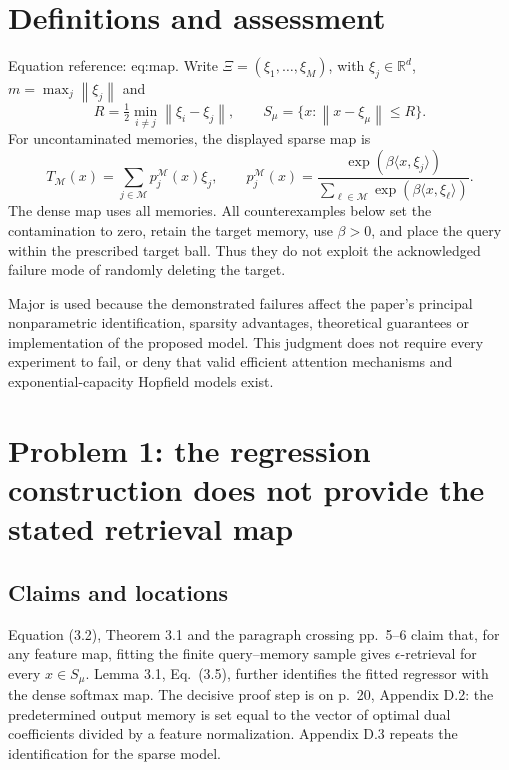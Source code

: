\documentclass[10pt]{article}
\begin{document}
\section*{Definitions and assessment}
Equation reference: eq:map. Write \(\Xi=(\xi_1,\ldots,\xi_M)\), with \(\xi_j\in\mathbb R^d\), \(m=\max_j\left\lVert \xi_j\right\rVert\) and \[R=\tfrac12\min_{i\ne j}\left\lVert \xi_i-\xi_j\right\rVert,\qquad
 S_\mu=\{x:\left\lVert x-\xi_\mu\right\rVert\le R\}.\] For uncontaminated memories, the displayed sparse map is \[
 T_\mathcal M(x)=\sum_{j\in\mathcal M}p^\mathcal M_j(x)\xi_j,\qquad
 p^\mathcal M_j(x)=\frac{\exp(\beta\langle x,\xi_j\rangle)}
 {\sum_{\ell\in\mathcal M}\exp(\beta\langle x,\xi_\ell\rangle)}.\] The dense map uses all memories. All counterexamples below set the contamination to zero, retain the target memory, use \(\beta>0\), and place the query within the prescribed target ball. Thus they do not exploit the acknowledged failure mode of randomly deleting the target.\par
Major is used because the demonstrated failures affect the paper’s principal nonparametric identification, sparsity advantages, theoretical guarantees or implementation of the proposed model. This judgment does not require every experiment to fail, or deny that valid efficient attention mechanisms and exponential-capacity Hopfield models exist.\par
\section*{Problem 1: the regression construction does not provide the stated retrieval map}
\subsection*{Claims and locations}
Equation (3.2), Theorem 3.1 and the paragraph crossing pp. 5–6 claim that, for any feature map, fitting the finite query–memory sample gives \(\epsilon\)-retrieval for every \(x\in S_\mu\). Lemma 3.1, Eq. (3.5), further identifies the fitted regressor with the dense softmax map. The decisive proof step is on p. 20, Appendix D.2: the predetermined output memory is set equal to the vector of optimal dual coefficients divided by a feature normalization. Appendix D.3 repeats the identification for the sparse model.\par
\end{document}
